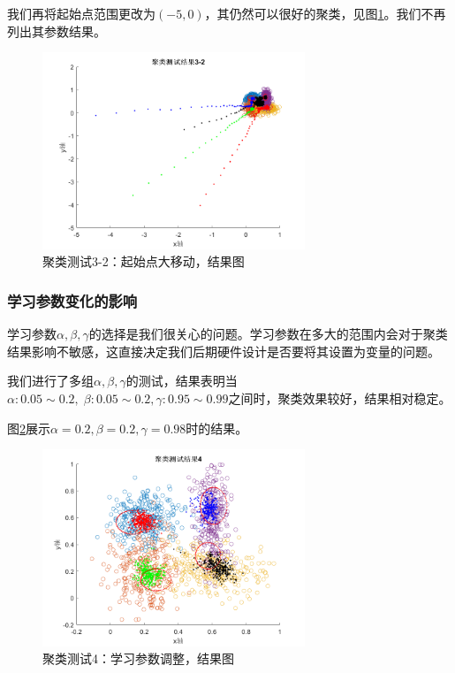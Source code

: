 我们再将起始点范围更改为$(-5,0)$，其仍然可以很好的聚类，见图\ref{fig:clustest3-2re}。我们不再列出其参数结果。

\begin{figure}[htbp]
   \centering
   \includegraphics[width=0.7\textwidth]{ClusterTest32Result1.png} %
   \caption{聚类测试3-2：起始点大移动，结果图}
   \label{fig:clustest3-2re}
\end{figure}

\subsubsection{学习参数变化的影响}
学习参数$\alpha,\beta,\gamma$的选择是我们很关心的问题。学习参数在多大的范围内会对于聚类结果影响不敏感，这直接决定我们后期硬件设计是否要将其设置为变量的问题。

我们进行了多组$\alpha,\beta,\gamma$的测试，结果表明当$\alpha:0.05\sim 0.2,\;\beta:0.05\sim 0.2, \gamma: 0.95\sim 0.99$之间时，聚类效果较好，结果相对稳定。

图\ref{fig:clustest4re}展示$\alpha=0.2,\beta=0.2,\gamma=0.98$时的结果。

\begin{figure}[htbp]
   \centering
   \includegraphics[width=0.7\textwidth]{ClusterTest4Result.png} %
   \caption{聚类测试4：学习参数调整，结果图}
   \label{fig:clustest4re}
\end{figure}

